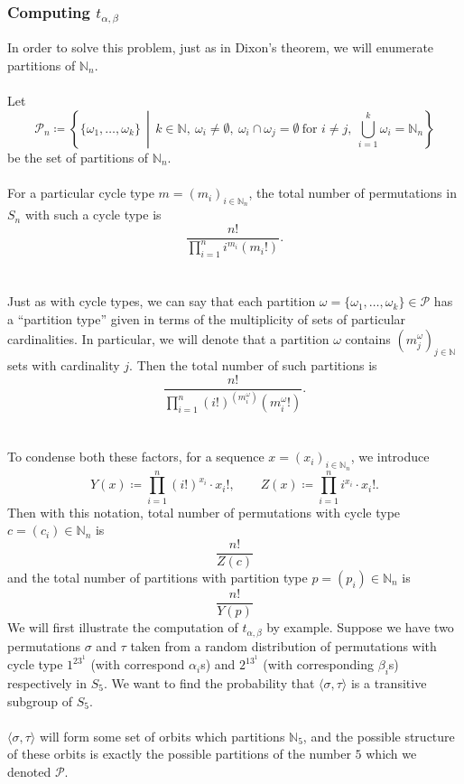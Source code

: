 \subsubsection{Computing $t_{\alpha, \beta}$}
In order to solve this problem, just as in Dixon's theorem, we will enumerate partitions of $\mathbb{N}_n$. \\\\Let
\[
\mathcal{P}_n \coloneqq \left\{ \{ \omega_1, \dots, \omega_k \} \,\middle|\, k \in \mathbb{N},\ \omega_i \neq \emptyset,\ \omega_i \cap \omega_j = \emptyset\ \text{for } i \neq j,\ \bigcup_{i=1}^k \omega_i = \mathbb{N}_n \right\}
\]be the set of partitions of \( \mathbb{N}_n \). 
\\\\For a particular cycle type $m = (m_i)_{i\in\mathbb{N}_n}$, the total number of permutations in $S_n$ with such a cycle type is 
\[
    \frac{n!}{\prod_{i=1}^ni^{m_i}(m_i!)}.
\]
\\\\Just as with cycle types, we can say that each partition $\omega = \{\omega_1,\dots, \omega_k\}\in\mathcal{P}$ has a ``partition type'' given in terms of the multiplicity of sets of particular cardinalities. In particular, we will denote that a partition $\omega$ contains $(m_j^{\omega})_{j\in\mathbb{N}}$ sets with cardinality $j$. Then the total number of such partitions is 
\[
    \frac{n!}{\prod_{i=1}^n(i!)^{(m_i^{\omega})}(m_i^{\omega}!)}.
\]
\\\\To condense both these factors, for a sequence $x = (x_i)_{i\in\mathbb{N}_n}$, we introduce
\[
Y(x) \coloneqq \prod_{i=1}^n (i!)^{x_i} \cdot x_i!, \qquad
Z(x) \coloneqq \prod_{i=1}^n i^{x_i} \cdot x_i!.
\]
Then with this notation, total number of permutations with cycle type $c = (c_i)\in\mathbb{N}_n$ is 
\[
    \frac{n!}{Z(c)}
\]
and the total number of partitions with partition type $p = (p_i)\in\mathbb{N}_n$ is 
\[
    \frac{n!}{Y(p)}
\]
We will first illustrate the computation of $t_{\alpha,\beta}$ by example. Suppose we have two permutations $\sigma$ and $\tau$ taken from a random distribution of permutations with cycle type $1^23^1$ (with correspond $\alpha_i$s)  and $2^13^1$ (with corresponding $\beta_i$s) respectively in $S_5$. We want to find the probability that $\langle \sigma, \tau \rangle$ is a transitive subgroup of $S_5$.
\\\\$\langle \sigma, \tau \rangle$ will form some set of orbits which partitions $\mathbb{N}_5$, and the possible structure of these orbits is exactly the possible partitions of the number $5$ which we denoted $\mathcal{P}$. 

